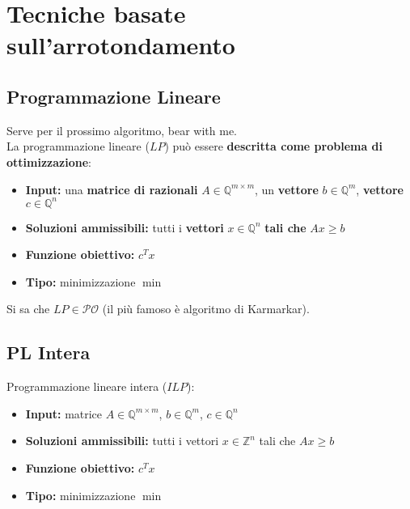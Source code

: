 
\section{Tecniche basate sull'arrotondamento}
\subsection*{Programmazione Lineare}

Serve per il prossimo algoritmo, bear with me.\\

La programmazione lineare ($LP$) può essere \textbf{descritta come problema di ottimizzazione}: 
\begin{itemize}
	\item \textbf{Input:} una \textbf{matrice di razionali} $A \in \mathbb{Q}^{m \times m}$, un \textbf{vettore} $b \in \mathbb{Q}^m$, \textbf{vettore} $c \in \mathbb{Q}^n$
	
	\item \textbf{Soluzioni ammissibili:} tutti i \textbf{vettori} $x \in \mathbb{Q}^n$ \textbf{tali che} $Ax \geq b$
	
	\item \textbf{Funzione obiettivo:} $c^T x$
	
	\item \textbf{Tipo:} minimizzazione $\min$
\end{itemize}

Si sa che $LP \in \mathcal{PO}$ (il più famoso è algoritmo di Karmarkar).\\

\subsection*{PL Intera}
Programmazione lineare intera ($ILP$):
\begin{itemize}
	\item \textbf{Input:} matrice $A \in \mathbb{Q}^{m \times m}$, $b \in \mathbb{Q}^m$,  $c \in \mathbb{Q}^n$
	
	\item \textbf{Soluzioni ammissibili:} tutti i vettori $x \in \mathbb{Z}^n$ tali che $Ax \geq b$
	
	\item \textbf{Funzione obiettivo:} $c^T x$
	
	\item \textbf{Tipo:} minimizzazione $\min$
\end{itemize}

